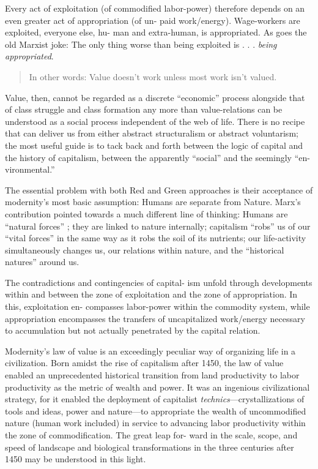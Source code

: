 \documentclass[
]{book}
\begin{document}
Every act of exploitation (of commodified labor-power)
therefore depends on an even greater act of appropriation (of un-
paid work/energy). Wage-workers are exploited, everyone else, hu-
man and extra-human, is appropriated. As goes the old Marxist joke:
The only thing worse than being exploited is . . . \emph{being appropriated}.

\begin{quote}
In other words: Value doesn't work unless most work isn't valued.
\end{quote}

Value, then, cannot be regarded as a discrete ``economic'' process
alongside that of class struggle and class formation any more than
value-relations can be understood as a social process independent of
the web of life. There is no recipe that can deliver us from either
abstract structuralism or abstract voluntarism; the most useful guide
is to tack back and forth between the logic of capital and the history
of capitalism, between the apparently ``social'' and the seemingly ``en-
vironmental.''

The essential problem with both Red
and Green approaches is their acceptance of modernity's most basic
assumption: Humans are separate from Nature.
Marx's contribution pointed towards a much different line of thinking:
Humans are ``natural forces'' ; they are linked to nature
internally; capitalism ``robs'' us of our ``vital forces'' in the same
way as it robs the soil of its nutrients; our life-activity
simultaneously changes us, our relations within nature, and the ``historical
natures'' around us.

The contradictions and contingencies of capital-
ism unfold through developments within and between the zone of
exploitation and the zone of appropriation. In this, exploitation en-
compasses labor-power within the commodity system, while appropriation
encompasses the transfers of uncapitalized work/energy necessary
to accumulation but not actually penetrated by the capital
relation.

Modernity's law of value is an exceedingly peculiar way of organizing
life in a civilization. Born amidst the rise of capitalism after
1450, the law of value enabled an unprecedented historical transition
from land productivity to labor productivity as the metric of wealth
and power. It was an ingenious civilizational strategy, for it enabled
the deployment of capitalist \emph{technics}---crystallizations of tools and
ideas, power and nature---to appropriate the wealth of uncommodified
nature (human work included) in service to advancing labor
productivity within the zone of commodification. The great leap for-
ward in the scale, scope, and speed of landscape and biological
transformations in the three centuries after 1450 may be understood in
this light.
\end{document}
